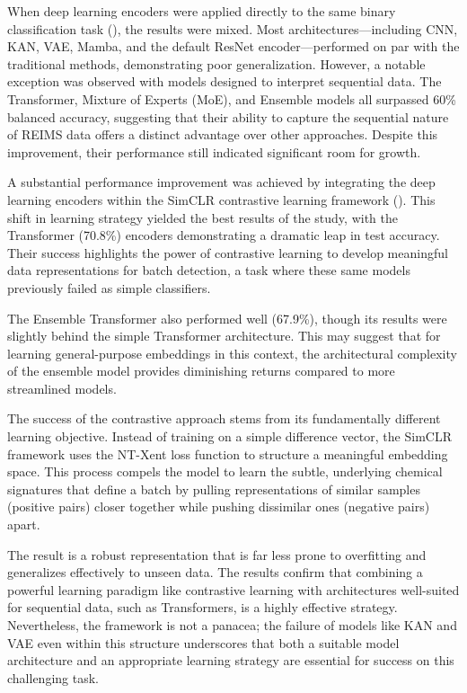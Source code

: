 When deep learning encoders were applied directly to the same binary classification task (), the results were mixed. Most architectures—including CNN, KAN, VAE, Mamba, and the default ResNet encoder—performed on par with the traditional methods, demonstrating poor generalization. However, a notable exception was observed with models designed to interpret sequential data. The Transformer, Mixture of Experts (MoE), and Ensemble models all surpassed 60\% balanced accuracy, suggesting that their ability to capture the sequential nature of REIMS data offers a distinct advantage over other approaches. Despite this improvement, their performance still indicated significant room for growth.

A substantial performance improvement was achieved by integrating the deep learning encoders within the SimCLR contrastive learning framework (). This shift in learning strategy yielded the best results of the study, with the Transformer (70.8\%) encoders demonstrating a dramatic leap in test accuracy. Their success highlights the power of contrastive learning to develop meaningful data representations for batch detection, a task where these same models previously failed as simple classifiers.

The Ensemble Transformer also performed well (67.9\%), though its results were slightly behind the simple Transformer architecture. This may suggest that for learning general-purpose embeddings in this context, the architectural complexity of the ensemble model provides diminishing returns compared to more streamlined models.

The success of the contrastive approach stems from its fundamentally different learning objective. Instead of training on a simple difference vector, the SimCLR framework uses the NT-Xent loss function to structure a meaningful embedding space. This process compels the model to learn the subtle, underlying chemical signatures that define a batch by pulling representations of similar samples (positive pairs) closer together while pushing dissimilar ones (negative pairs) apart.

The result is a robust representation that is far less prone to overfitting and generalizes effectively to unseen data. The results confirm that combining a powerful learning paradigm like contrastive learning with architectures well-suited for sequential data, such as Transformers, is a highly effective strategy. Nevertheless, the framework is not a panacea; the failure of models like KAN and VAE even within this structure underscores that both a suitable model architecture and an appropriate learning strategy are essential for success on this challenging task.

